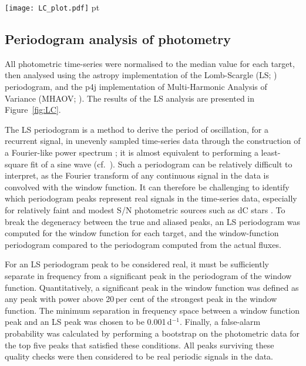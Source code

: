 \documentclass[fleqn,usenatbib,useAMS]{mnras}
\begin{document}
\begin{figure*}
\texttt{[image: LC\_plot.pdf]}
 pt
\caption{\textit{Left:} Lomb-Scargle periodograms for the six dC stars studied here, in addition to J1250.  The most significant peak in the periodogram is highlighted with an orange vertical bar.  \textit{Right:} The phase-folded light-curves corresponding to the strongest periodogram peak for each target.  }
\label{fig:LC}
\end{figure*}


\subsection{Periodogram analysis of photometry}\label{P_analysis}

All photometric time-series were normalised to the median value for each target, then analysed using the {\sc astropy} implementation of the Lomb-Scargle (LS; \citealt{Lomb1976,Scargle1982}) periodogram, and the {\sc p4j} \citep{P4J} implementation of Multi-Harmonic Analysis of Variance (MHAOV; \citealt{Schwarz1996}).  The results of the LS analysis are presented in Figure~\ref{fig:LC}.

The LS periodogram is a method to derive the period of oscillation, for a recurrent signal, in unevenly sampled time-series data through the construction of a Fourier-like power spectrum \citep{Van2018}; it is almost equivalent to performing a least-square fit of a sine wave (cf.\ \citealt{Zech09}).  Such a periodogram can be relatively difficult to interpret, as the Fourier transform of any continuous signal in the data is convolved with the window function.  It can therefore be challenging to identify which periodogram peaks represent real signals in the time-series data, especially for relatively faint and modest S/N photometric sources such as dC stars \citep{Roulston2021}.  To break the degeneracy between the true and aliased peaks, an LS periodogram was computed for the window function for each target, and the window-function periodogram compared to the periodogram computed from the actual fluxes.

For an LS periodogram peak to be considered real, it must be sufficiently separate in frequency from a significant peak in the periodogram of the window function.  Quantitatively, a significant peak in the window function was defined as any peak with power above 20\,per cent of the strongest peak in the window function.  The minimum separation in frequency space between a window function peak and an LS peak was chosen to be 0.001\,d$^{-1}$.  Finally, a false-alarm probability was calculated by performing a bootstrap on the photometric data for the top five peaks that satisfied these conditions.  All peaks surviving these quality checks were then considered to be real periodic signals in the data.
\end{document}
